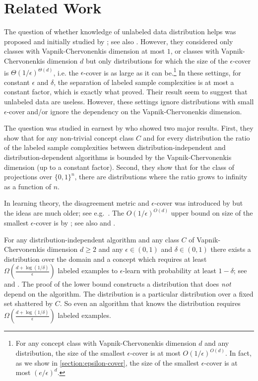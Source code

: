 \section{Related Work}
\label{section:related-work}

The question of whether knowledge of unlabeled data distribution helps was
proposed and initially studied by \cite{Ben-David-Lu-Pal-2008}; see also
\cite{Lu-2009}. However, they considered only classes with Vapnik-Chervonenkis
dimension at most $1$, or classes with Vapnik-Chervonenkis dimension $d$ but
only distributions for which the size of the $\epsilon$-cover is
$\Theta(1/\epsilon)^{\Theta(d)}$, i.e. the $\epsilon$-cover is as large as it
can be.\footnote{For any concept class with Vapnik-Chervonenkis dimension $d$
and any distribution, the size of the smallest $\epsilon$-cover is at most
$O(1/\epsilon)^{O(d)}$. In fact, as we show in \autoref{section:epsilon-cover},
the size of the smallest $\epsilon$-cover is at most $(e/\epsilon)^d$.} In these
settings, for constant $\epsilon$ and $\delta$, the separation of labeled sample
complexities is at most a constant factor, which is exactly what
\cite{Ben-David-Lu-Pal-2008} proved. Their result seem to suggest that unlabeled
data are useless. However, these settings ignore distributions with small
$\epsilon$-cover and/or ignore the dependency on the Vapnik-Chervonenkis
dimension.

The question was studied in earnest by \cite{Darnstadt-Simon-Szorenyi-2013} who
showed two major results. First, they show that for any non-trivial concept
class $C$ and for every distribution the ratio of the labeled sample
complexities between distribution-independent and distribution-dependent
algorithms is bounded by the Vapnik-Chervonenkis dimension (up to a constant
factor). Second, they show that for the class of projections over $\{0,1\}^n$,
there are distributions where the ratio grows to infinity as a function of $n$.

In learning theory, the disagreement metric and $\epsilon$-cover was  introduced
by \cite{Benedek-Itai-1991} but the ideas are much older; see
e.g.~\cite{Dudley-1978, Dudley-1984}. The $O(1/\epsilon)^{O(d)}$ upper
bound on size of the smallest $\epsilon$-cover is by \citet[Lemma
7.13]{Dudley-1978}; see also \citet[Chapter 4]{Devroye-Lugosi-2000} and
\cite{Haussler-1995}.

For any distribution-independent algorithm and any class $C$ of
Vapnik-Chervonenkis dimension $d \ge 2$ and any $\epsilon \in (0,1)$ and $\delta
\in (0,1)$ there exists a distribution over the domain and a concept which
requires at least $\Omega \left(\frac{d + \log(1/\delta)}{\epsilon}\right)$
labeled examples to $\epsilon$-learn with probability at least $1 - \delta$;
see~\cite[Theorem 5.3]{Anthony-Bartlett-1999} and
\cite{Blumer-Ehrenfeucht-Haussler-Warmuth-1989,
Ehrenfeucht-Haussler-Kearns-Valiant-1989}. The proof of the lower bound
constructs a distribution that does \emph{not} depend on the algorithm. The
distribution is a particular distribution over a fixed set shattered by $C$. So
even an algorithm that knows the distribution requires $\Omega \left(\frac{d +
\log(1/\delta)}{\epsilon}\right)$ labeled examples.
